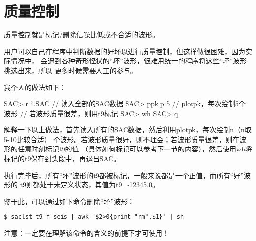 \section{质量控制}

质量控制就是标记/删除信噪比低或不合适的波形。

用户可以自己在程序中判断数据的好坏以进行质量控制，但这样做很困难，因为实际情况中，
会遇到各种奇形怪状的``坏''波形，很难用统一的程序将这些``坏''波形挑选出来，所以
更多时候需要人工的参与。


我个人的做法如下：
\begin{SACCode}
SAC> r *.SAC        // 读入全部的SAC数据
SAC> ppk p 5        // plotpk，每次绘制5个波形
// 若波形质量很差，则用t9标记
SAC> wh
SAC> q
\end{SACCode}

解释一下以上做法，首先读入所有的SAC数据，然后利用plotpk，每次绘制n（n取5-10比较合适）
个波形。若波形质量很好，则不理会；若波形质量很差，则在波形的任意时刻标记t9的值
（具体如何标记可以参考下一节的内容），然后使用wh将标记的t9保存到头段中，再退出SAC。

执行完毕后，所有``坏''波形的t9都被标记，一般来说都是一个正值，而所有``好''波形的
t9则都处于未定义状态，其值为t9=-12345.0。

鉴于此，可以通过如下命令删除``坏''波形：
\begin{lstlisting}[style=Bash]
$ saclst t9 f seis | awk '$2>0{print "rm",$1}' | sh
\end{lstlisting}

注意：一定要在理解该命令的含义的前提下才可使用！
